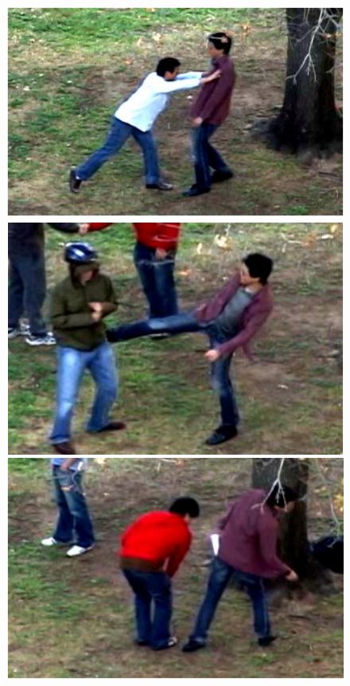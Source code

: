 \documentclass[10pt,twocolumn,letterpaper]{article}
\begin{document}
\begin{figure}[!t]
\begin{center}
\includegraphics[scale=0.4]{figures/dataset_thumb/uti/crop_class3.pdf} 
\includegraphics[scale=0.4]{figures/dataset_thumb/uti/crop_class4.pdf} 
\includegraphics[scale=0.4]{figures/dataset_thumb/uti/crop_class5.pdf} 

\end{center}
\end{figure}
\end{document}
